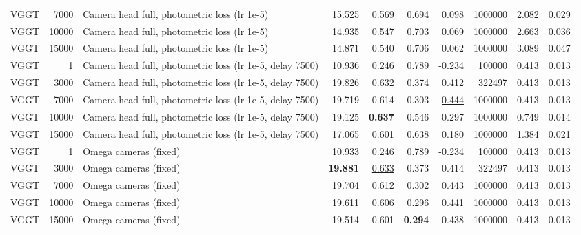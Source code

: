 \begin{table}[H]
\begin{tabular}{lrlrrrrrrr}
VGGT & 7000 & Camera head full, photometric loss (lr 1e-5) & 15.525 & 0.569 & 0.694 & 0.098 & 1000000 & 2.082 & 0.029 \\
VGGT & 10000 & Camera head full, photometric loss (lr 1e-5) & 14.935 & 0.547 & 0.703 & 0.069 & 1000000 & 2.663 & 0.036 \\
VGGT & 15000 & Camera head full, photometric loss (lr 1e-5) & 14.871 & 0.540 & 0.706 & 0.062 & 1000000 & 3.089 & 0.047 \\
VGGT & 1 & Camera head full, photometric loss (lr 1e-5, delay 7500) & 10.936 & 0.246 & 0.789 & -0.234 & 100000 & 0.413 & 0.013 \\
VGGT & 3000 & Camera head full, photometric loss (lr 1e-5, delay 7500) & 19.826 & 0.632 & 0.374 & 0.412 & 322497 & 0.413 & 0.013 \\
VGGT & 7000 & Camera head full, photometric loss (lr 1e-5, delay 7500) & 19.719 & 0.614 & 0.303 & \underline{0.444} & 1000000 & 0.413 & 0.013 \\
VGGT & 10000 & Camera head full, photometric loss (lr 1e-5, delay 7500) & 19.125 & \textbf{0.637} & 0.546 & 0.297 & 1000000 & 0.749 & 0.014 \\
VGGT & 15000 & Camera head full, photometric loss (lr 1e-5, delay 7500) & 17.065 & 0.601 & 0.638 & 0.180 & 1000000 & 1.384 & 0.021 \\
VGGT & 1 & Omega cameras (fixed) & 10.933 & 0.246 & 0.789 & -0.234 & 100000 & 0.413 & 0.013 \\
VGGT & 3000 & Omega cameras (fixed) & \textbf{19.881} & \underline{0.633} & 0.373 & 0.414 & 322497 & 0.413 & 0.013 \\
VGGT & 7000 & Omega cameras (fixed) & 19.704 & 0.612 & 0.302 & 0.443 & 1000000 & 0.413 & 0.013 \\
VGGT & 10000 & Omega cameras (fixed) & 19.611 & 0.606 & \underline{0.296} & 0.441 & 1000000 & 0.413 & 0.013 \\
VGGT & 15000 & Omega cameras (fixed) & 19.514 & 0.601 & \textbf{0.294} & 0.438 & 1000000 & 0.413 & 0.013 \\
\bottomrule
\end{tabular}
\end{table}